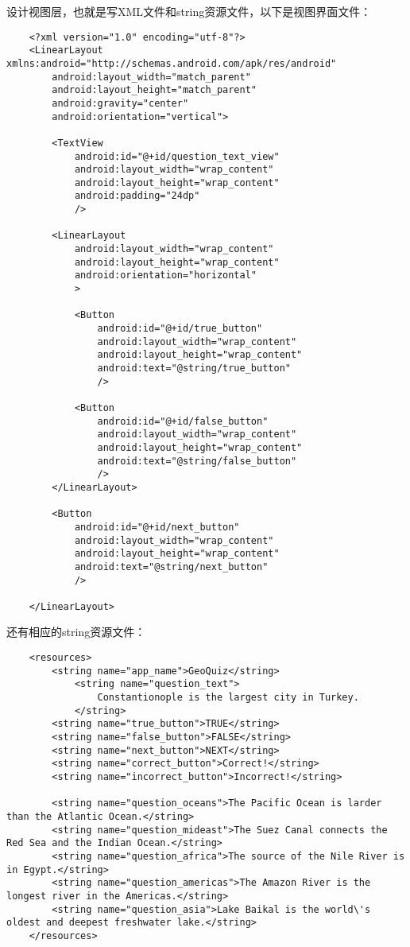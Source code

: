 \documentclass[a4paper,left=2.5cm,right=2.5cm,11pt]{report}
\begin{document}
	设计视图层，也就是写XML文件和string资源文件，以下是视图界面文件：
	\begin{lstlisting}
	<?xml version="1.0" encoding="utf-8"?>
	<LinearLayout xmlns:android="http://schemas.android.com/apk/res/android"
		android:layout_width="match_parent"
		android:layout_height="match_parent"
		android:gravity="center"
		android:orientation="vertical">

		<TextView
			android:id="@+id/question_text_view"
			android:layout_width="wrap_content"
			android:layout_height="wrap_content"
			android:padding="24dp"
			/>

		<LinearLayout
			android:layout_width="wrap_content"
			android:layout_height="wrap_content"
			android:orientation="horizontal"
			>

			<Button
				android:id="@+id/true_button"
				android:layout_width="wrap_content"
				android:layout_height="wrap_content"
				android:text="@string/true_button"
				/>

			<Button
				android:id="@+id/false_button"
				android:layout_width="wrap_content"
				android:layout_height="wrap_content"
				android:text="@string/false_button"
				/>
		</LinearLayout>

		<Button
			android:id="@+id/next_button"
			android:layout_width="wrap_content"
			android:layout_height="wrap_content"
			android:text="@string/next_button"
			/>

	</LinearLayout>
	\end{lstlisting}

	还有相应的string资源文件：
	\begin{lstlisting}
	<resources>
		<string name="app_name">GeoQuiz</string>
			<string name="question_text">
				Constantionople is the largest city in Turkey.
			</string>
		<string name="true_button">TRUE</string>
		<string name="false_button">FALSE</string>
		<string name="next_button">NEXT</string>
		<string name="correct_button">Correct!</string>
		<string name="incorrect_button">Incorrect!</string>

		<string name="question_oceans">The Pacific Ocean is larder than the Atlantic Ocean.</string>
		<string name="question_mideast">The Suez Canal connects the Red Sea and the Indian Ocean.</string>
		<string name="question_africa">The source of the Nile River is in Egypt.</string>
		<string name="question_americas">The Amazon River is the longest river in the Americas.</string>
		<string name="question_asia">Lake Baikal is the world\'s oldest and deepest freshwater lake.</string>
	</resources>
	\end{lstlisting}
\end{document}

